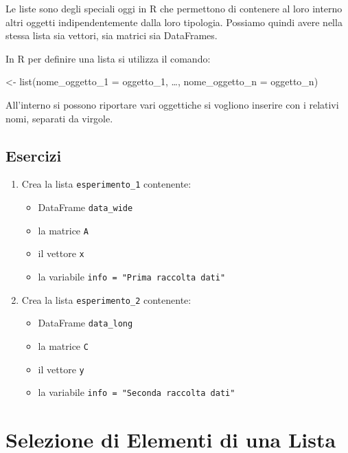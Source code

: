 \documentclass[
]{book}
\providecommand{\tightlist}{%
  \setlength{\itemsep}{0pt}\setlength{\parskip}{0pt}}
\begin{document}
Le liste sono degli speciali oggi in R che permettono di contenere al loro interno altri oggetti indipendentemente dalla loro tipologia. Possiamo quindi avere nella stessa lista sia vettori, sia matrici sia DataFrames.

In R per definire una lista si utilizza il comando:

\textless- list(nome\_oggetto\_1 = oggetto\_1, \ldots, nome\_oggetto\_n = oggetto\_n)

All'interno si possono riportare vari oggettiche si vogliono inserire con i relativi nomi, separati da virgole.

\hypertarget{esercizi-10}{%
\subsection*{Esercizi}\label{esercizi-10}}

\begin{enumerate}
\def\labelenumi{\arabic{enumi}.}
\tightlist
\item
  Crea la lista \texttt{esperimento\_1} contenente:

  \begin{itemize}
  \tightlist
  \item
    DataFrame \texttt{data\_wide}
  \item
    la matrice \texttt{A}
  \item
    il vettore \texttt{x}
  \item
    la variabile \texttt{info\ =\ "Prima\ raccolta\ dati"}
  \end{itemize}
\item
  Crea la lista \texttt{esperimento\_2} contenente:

  \begin{itemize}
  \tightlist
  \item
    DataFrame \texttt{data\_long}
  \item
    la matrice \texttt{C}
  \item
    il vettore \texttt{y}
  \item
    la variabile \texttt{info\ =\ "Seconda\ raccolta\ dati"}
  \end{itemize}
\end{enumerate}

\hypertarget{selezione-di-elementi-di-una-lista}{%
\section{Selezione di Elementi di una Lista}\label{selezione-di-elementi-di-una-lista}}
\end{document}
